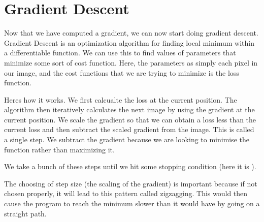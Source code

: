 \documentclass[letterpaper,10pt,english]{jupyterBook}
\begin{document}
\section{Gradient Descent}
\label{\detokenize{finite_gradient:gradient-descent}}
\sphinxAtStartPar
Now that we have computed a gradient, we can now start doing gradient descent. Gradient Descent is an optimization algorithm for finding local minimum within a differentiable function. We can use this to find values of parameters that minimize some sort of cost function. Here, the parameters as simply each pixel in our image, and the cost functions that we are trying to minimize is the loss function.

\sphinxAtStartPar
Heres how it works. We first calcualte the loss at the current position. The algorithm then iteratively calculates the next image by using the gradient at the current position. We scale the gradient so that we can obtain a loss less than the current loss and then subtract the scaled gradient from the image. This is called a single step. We subtract the gradient because we are looking to minimise the function rather than maximizing it.

\sphinxAtStartPar
We take a bunch of these steps until we hit some stopping condition (here it is ).

\sphinxAtStartPar
The choosing of step size (the scaling of the gradient) is important because if not chosen properly, it will lead to this pattern called zig\sphinxhyphen{}zagging. This would then cause the program to reach the minimum slower than it would have by going on a straight path.
\end{document}
